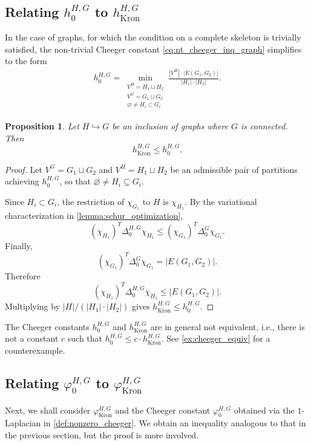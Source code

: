 \documentclass{article}
\newtheorem{proposition}{Proposition}[section]
\begin{document}
\subsection{Relating $h_{0}^{H, G}$ to $h_{\operatorname{Kron}}^{H, G}$}
In the case of graphs, for which the condition on a complete skeleton is trivially satisfied, 
the non-trivial Cheeger constant  \cref{eq:nt_cheeger_inq_graph} simplifies to the form
\begin{align}
\label{eq.complete.skeleton.graph}
h_{0}^{H, G}=
\min_{\substack{V^H=H_1\sqcup H_2\\
V^G=G_1\sqcup G_2\\\varnothing \neq H_i\subset G_i}}\frac{|V^H|\cdot |E(G_1, G_2)|}{|H_1|\cdot |H_2|}.
\end{align}

\begin{proposition}
\label{prop:ineq_cheger_kron_nonzero_1}
Let \(H\hookrightarrow G\) be an inclusion of graphs where $G$ is connected. Then
\[
h_{\operatorname{Kron}}^{H,G}\leq h_0^{H,G}.
\]
\end{proposition}

\begin{proof}
Let \(V^G=G_1\sqcup G_2\) and \(V^H=H_1\sqcup H_2\) be an admissible pair of partitions achieving \(h_0^{H,G}\), so that \(\varnothing\neq H_i\subseteq G_i\).

Since \(H_i\subset G_i\), the restriction of \(\chi_{G_1}\) to \(H\) is \(\chi_{H_1}\). By the variational characterization in \cref{lemma:schur_optimization},
\[
(\chi_{H_1})^T\Delta_0^{H,G}\chi_{H_1}\leq (\chi_{G_1})^T\Delta_0^G\chi_{G_1}.
\]
Finally,
\[
(\chi_{G_1})^T\Delta_0^G\chi_{G_1}=|E(G_1,G_2)|.
\]
Therefore
\[
(\chi_{H_1})^T\Delta_0^{H,G}\chi_{H_1}\leq |E(G_1,G_2)|.
\]
Multiplying by \(|H|/(|H_1|\cdot |H_2|)\) gives \(h_{\operatorname{Kron}}^{H,G}\leq h_0^{H,G}\).
\end{proof}


The Cheeger constants $h_0^{H, G}$ and $h_{\operatorname{Kron}}^{H, G}$ are in general not equivalent,
i.e.,
there is not a constant $c$ such that $ 
h_{0}^{H, G}  \leq c \cdot h_{\operatorname{Kron}}^{H, G}$. See \cref{ex:cheeger_equiv} for a counterexample.


\subsection{Relating $\varphi_0^{H, G}$ to $\varphi_{\operatorname{Kron}}^{H, G}$}
Next, we shall consider $\varphi_{\operatorname{Kron}}^{H, G}$ and the Cheeger constant $\varphi_0^{H, G}$ obtained via the $1$-Laplacian in \cref{def:nonzero_cheeger}. We obtain an inequality analogous to that in the previous section, but the proof is more involved.
\end{document}
